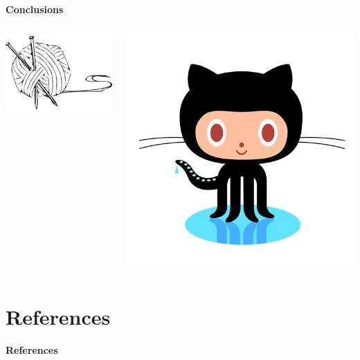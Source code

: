 \documentclass[serif]{beamer}\usepackage[]{graphicx}\usepackage[]{color}
\begin{document}
\begin{frame}{\textbf{Conclusions}}
\begin{columns}
\begin{column}{0.2\textwidth}
\centerline{\includegraphics[width = \textwidth]{fig/knit-logo.png}}
\end{column}
\begin{column}{0.2\textwidth}
\centerline{\includegraphics[width = \textwidth]{fig/octocat.png}}
\end{column}
\end{columns}
\end{frame}

\section{References}
\begin{frame}[t, shrink]{\textbf{References}}
\footnotesize
{}


\end{frame}
\end{document}
